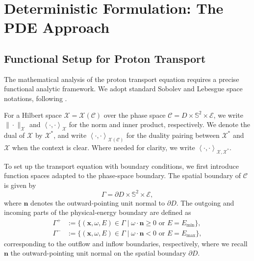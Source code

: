 \documentclass{amsart}
\theoremstyle{plain}
\renewcommand{\vec}[1]{\ensuremath{\boldsymbol{#1}}}
\newcommand{\ltwop}[2]{\ensuremath{\!\left\langle{#1,#2}\right\rangle}}
\begin{document}
\section{Deterministic Formulation: The PDE Approach}
\label{sec:deterministic}

\subsection{Functional Setup for Proton Transport}
\label{subsec:functional-setup}

The mathematical analysis of the proton transport equation requires a
precise functional analytic framework. We adopt standard Sobolev and
Lebesgue space notations, following \cite{Evans:1998}.

For a Hilbert space $\mathcal{X} = \mathcal{X}(\mathcal{C})$ over the
phase space $\mathcal{C} = D \times \mathbb{S}^2 \times \mathcal{E}$,
we write $\| \cdot \|_{\mathcal{X}}$ and
$\ltwop{\cdot}{\cdot}_{\mathcal{X}}$ for the norm and inner product,
respectively. We denote the dual of $\mathcal{X}$ by $\mathcal{X}^*$,
and write $\ltwop{\cdot}{\cdot}_{\mathcal{X}(\mathcal{C})}$ for the
duality pairing between $\mathcal{X}^*$ and $\mathcal{X}$ when the
context is clear. Where needed for clarity, we write
$\ltwop{\cdot}{\cdot}_{\mathcal{X}, \mathcal{X}^*}$.

To set up the transport equation with boundary conditions, we first
introduce function spaces adapted to the phase-space boundary. The
spatial boundary of $\mathcal{C}$ is given by
\begin{equation}
  \Gamma = \partial D \times \mathbb{S}^2 \times \mathcal{E},
\end{equation}
where $\vec{n}$ denotes the outward-pointing unit normal to $\partial
D$. The outgoing  and incoming parts of the physical-energy boundary
are defined  as
\begin{equation}
  \begin{split}
    \Gamma^+
    &:=
    \{ (\vec{x}, \omega, E) \in \Gamma \mid \omega \cdot \vec{n} \geq 0 \text{ or } E = E_{\min} \}, \\
    \Gamma^-
    &:=
    \{ (\vec{x}, \omega, E) \in \Gamma \mid \omega \cdot \vec{n} < 0 \text{ or } E = E_{\max} \},
  \end{split}
\end{equation}
corresponding to the outflow and inflow boundaries, respectively, where we recall $\vec{n}$ the
outward-pointing unit normal on the spatial boundary $\partial D$.
\end{document}
